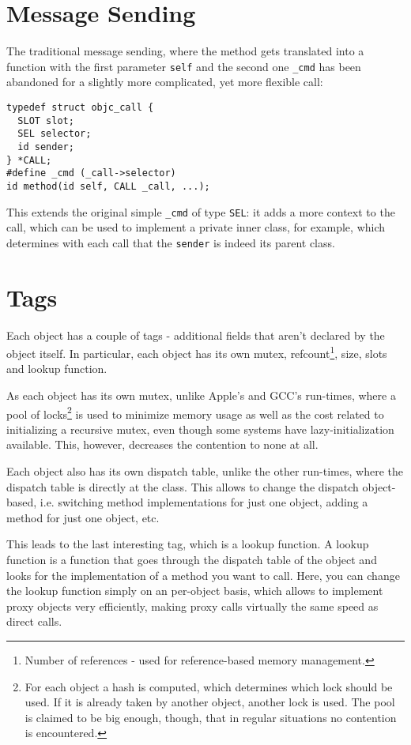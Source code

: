 \section{Message Sending}

The traditional message sending, where the method gets translated into a function with the first parameter \verb=self= and the second one \verb=_cmd= has been abandoned for a slightly more complicated, yet more flexible call:

\begin{verbatim}
typedef struct objc_call {
  SLOT slot;
  SEL selector;
  id sender;
} *CALL;
#define _cmd (_call->selector)
id method(id self, CALL _call, ...);
\end{verbatim}

This extends the original simple \verb=_cmd= of type \verb=SEL=: it adds a more context to the call, which can be used to implement a private inner class, for example, which determines with each call that the \verb=sender= is indeed its parent class.

\section{Tags}

Each object has a couple of tags - additional fields that aren't declared by the object itself. In particular, each object has its own mutex, refcount\footnote{Number of references - used for reference-based memory management.}, size, slots and lookup function.

As each object has its own mutex, unlike Apple's and GCC's run-times, where a pool of locks\footnote{For each object a hash is computed, which determines which lock should be used. If it is already taken by another object, another lock is used. The pool is claimed to be big enough, though, that in regular situations no contention is encountered.} is used to minimize memory usage as well as the cost related to initializing a recursive mutex, even though some systems have lazy-initialization available. This, however, decreases the contention to none at all.

Each object also has its own dispatch table, unlike the other run-times, where the dispatch table is directly at the class. This allows to change the dispatch object-based, i.e. switching method implementations for just one object, adding a method for just one object, etc.

This leads to the last interesting tag, which is a lookup function. A lookup function is a function that goes through the dispatch table of the object and looks for the implementation of a method you want to call. Here, you can change the lookup function simply on an per-object basis, which allows to implement proxy objects very efficiently, making proxy calls virtually the same speed as direct calls.

